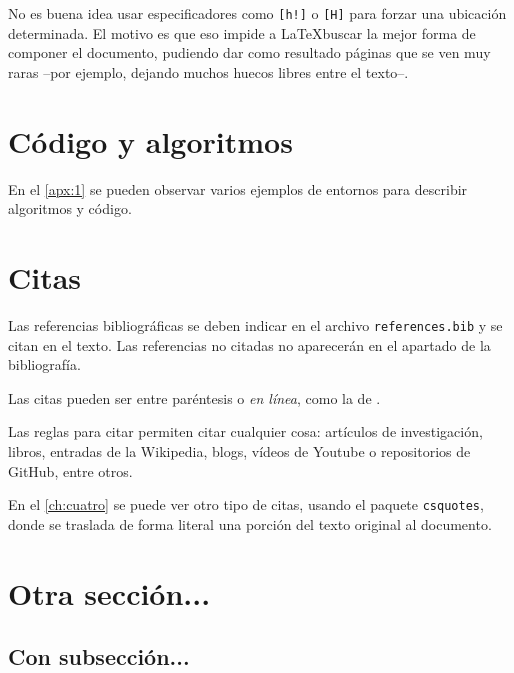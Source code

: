 No es buena idea usar especificadores como \texttt{[h!]} o \texttt{[H]} para forzar una ubicación determinada. El motivo es que eso impide a \LaTeX buscar la mejor forma de componer el documento, pudiendo dar como resultado páginas que se ven muy raras --por ejemplo, dejando muchos huecos libres entre el texto--.

\section{Código y algoritmos}

\noindent En el \autoref{apx:1} se pueden observar varios ejemplos de entornos para describir algoritmos y código.

\section{Citas}

\noindent Las referencias bibliográficas se deben indicar en el archivo \texttt{references.bib} y se citan en el texto. Las referencias no citadas no aparecerán en el apartado de la bibliografía.

Las citas pueden ser entre paréntesis \parencite{examplearticle} o \emph{en línea}, como la de \cite{examplegithub}.

Las  reglas para citar \parencite{ulllibguide} permiten citar cualquier cosa: artículos de investigación, libros, entradas de la Wikipedia, blogs, vídeos de Youtube o repositorios de GitHub, entre otros. 

En el \autoref{ch:cuatro} se puede ver otro tipo de citas, usando el paquete \texttt{csquotes}, donde se traslada de forma literal una porción del texto original al documento.
 
\section{Otra sección...}

\noindent \lipsum[1]

\subsection{Con subsección...}

\noindent \lipsum[2]